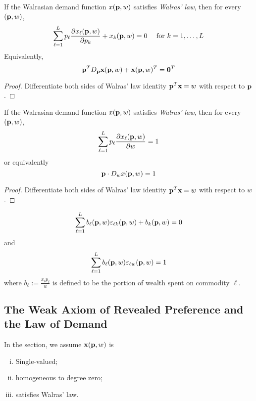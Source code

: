 \documentclass{article}
\begin{document}
 			\begin{proposition}
 				If the Walrasian demand function $x(\textbf{p}, w)$ satisfies \emph{Walras' law}, then for every $(\textbf{p}, w)$,
 				\begin{equation}
 					\sum_{\ell=1}^{L} p_{\ell} \frac{\partial x_{\ell}(\textbf{p}, w)}{\partial p_{k}}+x_{k}(\textbf{p}, w)= 0 \quad \text { for } k=1, \ldots, L
 				\end{equation}
 				Equivalently,
 				\begin{equation}
 					\textbf{p}^T D_{\textbf{p}} \textbf{x} (\textbf{p}, w) + \textbf{x}(\textbf{p}, w)^T = \textbf{0}^T
 				\end{equation}
 				\begin{proof}
 					Differentiate both sides of Walras' law identity $\textbf{p}^T \textbf{x} = w$ with respect to $\textbf{p}$.
 				\end{proof}
 			\end{proposition}
 			
 			\begin{proposition}
 				If the Walrasian demand function $x(\textbf{p}, w)$ satisfies \emph{Walras' law}, then for every $(\textbf{p}, w)$,
 				\begin{equation}
 					\sum_{\ell=1}^{L} p_{\ell} \frac{\partial x_{\ell}(\textbf{p}, w)}{\partial w}=1
 				\end{equation}
 				or equivalently
 				\begin{equation}
 					\textbf{p} \cdot D_{w} x(\textbf{p}, w) = 1
 				\end{equation}
 				\begin{proof}
 					Differentiate both sides of Walras' law identity $\textbf{p}^T \textbf{x} = w$ with respect to $w$.
 				\end{proof}
 			\end{proposition}
 		
 			\begin{proposition}[Exer. 2.E.2]
 				\begin{gather}
 					\sum_{\ell=1}^{L} b_{\ell}(\textbf{p}, w) \varepsilon_{\ell k}(\textbf{p}, w)+b_{k}(\textbf{p}, w)=0
 				\end{gather}
 				and
 				\begin{gather}
 					\sum_{\ell=1}^{L} b_{\ell}(\textbf{p}, w) \varepsilon_{\ell w}(\textbf{p}, w)=1
 				\end{gather}
 				where $b_\ell := \frac{x_\ell p_\ell}{w}$ is defined to be the portion of wealth spent on commodity $\ell$.
 			\end{proposition}
 			
 		\subsection{The Weak Axiom of Revealed Preference and the Law of Demand}
 			\begin{assumption}
 				In the section, we assume $\textbf{x}(\textbf{p}, w)$ is 
 				\begin{enumerate}[(i)]
 					\item Single-valued;
 					\item homogeneous to degree zero;
 					\item satisfies Walras' law.
 				\end{enumerate}
 			\end{assumption}
 			
\end{document}
